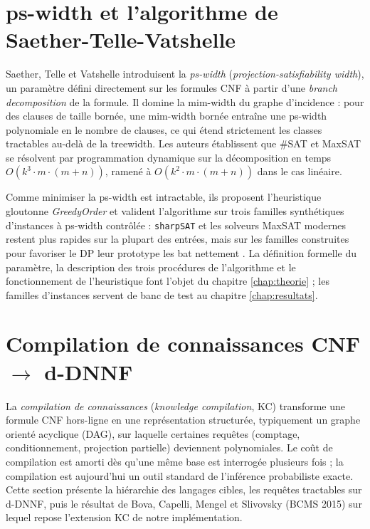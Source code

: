 \documentclass[11pt,a4paper]{report}
\theoremstyle{plain}
\theoremstyle{definition}
\begin{document}
\section{ps-width et l'algorithme de Saether-Telle-Vatshelle}
\label{sec:pswidth}

Saether, Telle et Vatshelle \cite{saether2015} introduisent la
\emph{ps-width} (\emph{projection-satisfiability width}), un paramètre
défini directement sur les formules CNF à partir d'une \emph{branch
decomposition} de la formule. Il domine la mim-width du graphe
d'incidence : pour des clauses de taille bornée, une mim-width bornée
entraîne une ps-width polynomiale en le nombre de clauses, ce qui étend
strictement les classes tractables au-delà de la treewidth. Les auteurs
établissent que \#SAT et MaxSAT se résolvent par programmation dynamique
sur la décomposition en temps $O(k^3 \cdot m \cdot (m+n))$, ramené à
$O(k^2 \cdot m \cdot (m+n))$ dans le cas linéaire.

Comme minimiser la ps-width est intractable, ils proposent l'heuristique
gloutonne \emph{GreedyOrder} et valident l'algorithme sur trois familles
synthétiques d'instances à ps-width contrôlée : \texttt{sharpSAT} et les
solveurs MaxSAT modernes restent plus rapides sur la plupart des entrées,
mais sur les familles construites pour favoriser le DP leur prototype les
bat nettement \cite{saether2015}. La définition formelle du paramètre,
la description des trois procédures de l'algorithme et le fonctionnement
de l'heuristique font l'objet du chapitre \ref{chap:theorie} ; les
familles d'instances servent de banc de test au
chapitre \ref{chap:resultats}.

\section{Compilation de connaissances CNF \texorpdfstring{$\to$}{vers} d-DNNF}
\label{sec:kc}

La \emph{compilation de connaissances} (\emph{knowledge compilation}, KC)
transforme une formule CNF hors-ligne en une représentation structurée,
typiquement un graphe orienté acyclique (DAG), sur laquelle certaines
requêtes (comptage, conditionnement, projection partielle) deviennent
polynomiales. Le coût
de compilation est amorti dès qu'une même base est interrogée plusieurs
fois ; la compilation est aujourd'hui un outil standard de l'inférence
probabiliste exacte. Cette section présente la hiérarchie des langages
cibles, les requêtes tractables sur d-DNNF, puis le résultat de Bova,
Capelli, Mengel et Slivovsky (BCMS 2015) sur lequel repose l'extension
KC de notre implémentation.
\end{document}
